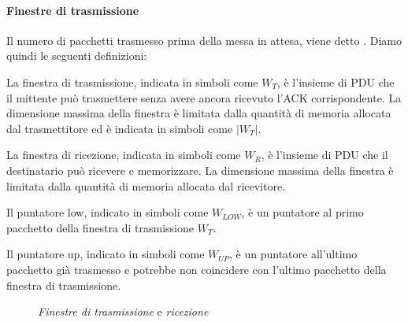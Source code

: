 \paragraph{Finestre di trasmissione}
Il numero di pacchetti trasmesso prima della messa in attesa, viene detto
. Diamo quindi le seguenti definizioni:
\begin{definition}
    La finestra di trasmissione, indicata in simboli come $W_T$, è l'insieme di
    PDU che il mittente può trasmettere senza avere ancora ricevuto l'ACK
    corrispondente. La dimensione massima della finestra è limitata dalla
    quantità di memoria allocata dal trasmettitore ed è indicata in simboli come
    $|W_T|$.
\end{definition}
\begin{definition}
    La finestra di ricezione, indicata in simboli come $W_R$, è l'insieme di
    PDU che il destinatario può ricevere e memorizzare. La dimensione massima
    della finestra è limitata dalla quantità di memoria allocata dal ricevitore.
\end{definition}
\begin{definition}
    Il puntatore low, indicato in simboli come $W_{LOW}$, è un puntatore al
    primo pacchetto della finestra di trasmissione $W_T$.
\end{definition}
\newpage
\begin{definition}[Puntatore up - \bm{$W_{UP}$}]
    Il puntatore up, indicato in simboli come $W_{UP}$, è un puntatore
    all'ultimo pacchetto già trasmesso e potrebbe non coincidere con l'ultimo
    pacchetto della finestra di trasmissione.
\end{definition}

\begin{figure}[ht]
    \centering
    \hfill
    \caption{\emph{Finestre di trasmissione} e \emph{ricezione}}
\end{figure}


